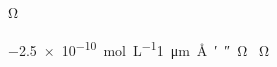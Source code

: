 \documentclass{scrbook}
\begin{document}
  \ifdefined\gtfamily\gtfamily\fi Ω
  {\ExplSyntaxOn\makeatletter
   \ttfamily\meaning\@begindocumenthook}
  
  \SI{-2.5e-10}{mol.L^{-1}}\SI{1}{\micro\metre\angstrom\arcminute\arcsecond\ohm}
  \vrule\SI{}{\ohm}\vrule
  
\end{document}
